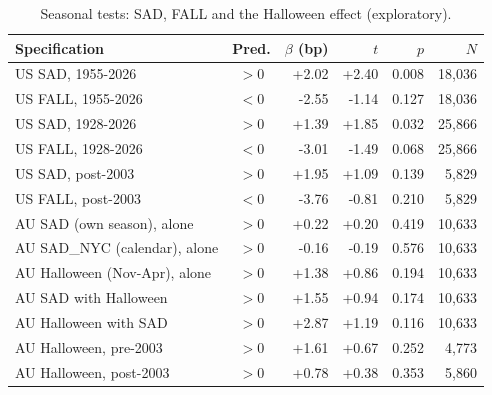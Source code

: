 \begin{table}[htbp]\centering\footnotesize
\caption{Seasonal tests: SAD, FALL and the Halloween effect (exploratory).}
\label{tab:robust_seasonal}
\begin{tabular}{lcrrrr}\toprule
Specification & Pred. & $\beta$ (bp) & $t$ & $p$ & $N$ \\ \midrule
US SAD, 1955-2026 & $>$0 & +2.02 & +2.40 & 0.008 & 18,036 \\
US FALL, 1955-2026 & $<$0 & -2.55 & -1.14 & 0.127 & 18,036 \\
US SAD, 1928-2026 & $>$0 & +1.39 & +1.85 & 0.032 & 25,866 \\
US FALL, 1928-2026 & $<$0 & -3.01 & -1.49 & 0.068 & 25,866 \\
US SAD, post-2003 & $>$0 & +1.95 & +1.09 & 0.139 & 5,829 \\
US FALL, post-2003 & $<$0 & -3.76 & -0.81 & 0.210 & 5,829 \\
AU SAD (own season), alone & $>$0 & +0.22 & +0.20 & 0.419 & 10,633 \\
AU SAD\_NYC (calendar), alone & $>$0 & -0.16 & -0.19 & 0.576 & 10,633 \\
AU Halloween (Nov-Apr), alone & $>$0 & +1.38 & +0.86 & 0.194 & 10,633 \\
AU SAD with Halloween & $>$0 & +1.55 & +0.94 & 0.174 & 10,633 \\
AU Halloween with SAD & $>$0 & +2.87 & +1.19 & 0.116 & 10,633 \\
AU Halloween, pre-2003 & $>$0 & +1.61 & +0.67 & 0.252 & 4,773 \\
AU Halloween, post-2003 & $>$0 & +0.78 & +0.38 & 0.353 & 5,860 \\
\bottomrule\end{tabular}\end{table}

